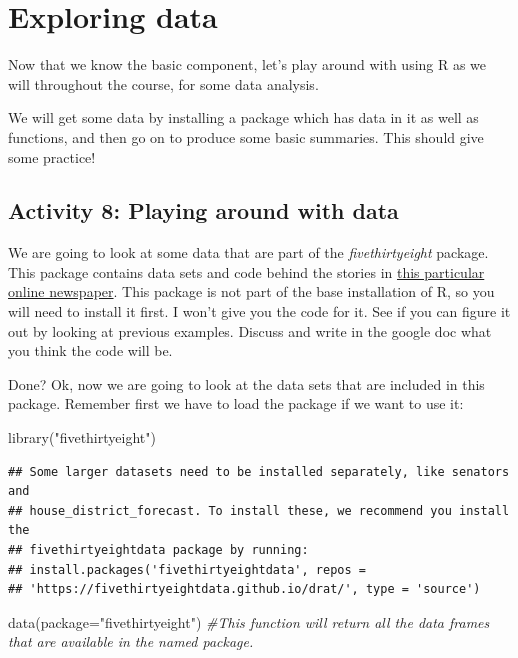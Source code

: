 \documentclass[
]{book}
\newenvironment{Shaded}{\begin{snugshade}}{\end{snugshade}}
\newcommand{\AttributeTok}[1]{\textcolor[rgb]{0.77,0.63,0.00}{#1}}
\newcommand{\CommentTok}[1]{\textcolor[rgb]{0.56,0.35,0.01}{\textit{#1}}}
\newcommand{\FunctionTok}[1]{\textcolor[rgb]{0.00,0.00,0.00}{#1}}
\newcommand{\NormalTok}[1]{#1}
\newcommand{\StringTok}[1]{\textcolor[rgb]{0.31,0.60,0.02}{#1}}
\begin{document}
\hypertarget{exploring-data}{%
\section{Exploring data}\label{exploring-data}}

Now that we know the basic component, let's play around with using R as we will throughout the course, for some data analysis.

We will get some data by installing a package which has data in it as well as functions, and then go on to produce some basic summaries. This should give some practice!

\hypertarget{activity-8-playing-around-with-data}{%
\subsection{Activity 8: Playing around with data}\label{activity-8-playing-around-with-data}}

We are going to look at some data that are part of the \emph{fivethirtyeight} package. This package contains data sets and code behind the stories in \href{http://fivethirtyeight.com/}{this particular online newspaper}. This package is not part of the base installation of R, so you will need to install it first. I won't give you the code for it. See if you can figure it out by looking at previous examples. Discuss and write in the google doc what you think the code will be.

Done? Ok, now we are going to look at the data sets that are included in this package. Remember first we have to load the package if we want to use it:

\begin{Shaded}
\begin{Highlighting}[]
\FunctionTok{library}\NormalTok{(}\StringTok{"fivethirtyeight"}\NormalTok{)}
\end{Highlighting}
\end{Shaded}

\begin{verbatim}
## Some larger datasets need to be installed separately, like senators and
## house_district_forecast. To install these, we recommend you install the
## fivethirtyeightdata package by running:
## install.packages('fivethirtyeightdata', repos =
## 'https://fivethirtyeightdata.github.io/drat/', type = 'source')
\end{verbatim}

\begin{Shaded}
\begin{Highlighting}[]
\FunctionTok{data}\NormalTok{(}\AttributeTok{package=}\StringTok{"fivethirtyeight"}\NormalTok{) }\CommentTok{\#This function will return all the data frames that are available in the named package.}
\end{Highlighting}
\end{Shaded}
\end{document}
